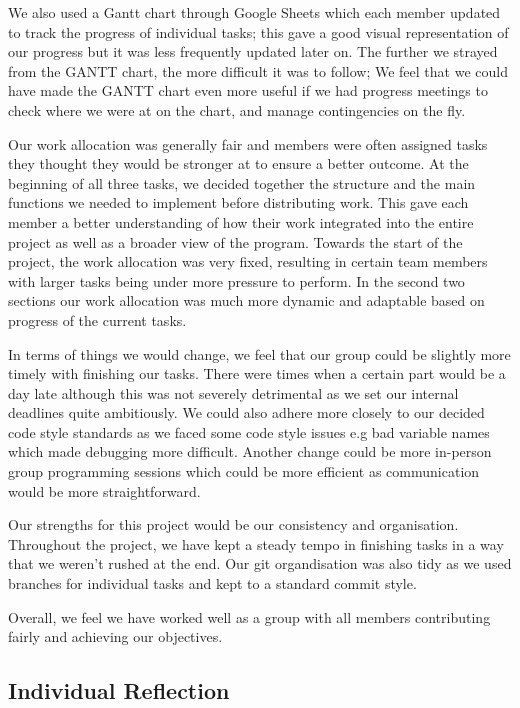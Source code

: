 \documentclass[11pt]{article}
\begin{document}
We also used a Gantt chart through Google Sheets which each member updated to track the progress of individual tasks; this gave a good visual representation of our progress but it was less frequently updated later on. The further we strayed from the GANTT chart, the more difficult it was to follow; We feel that we could have made the GANTT chart even more useful if we had progress meetings to check where we were at on the chart, and manage contingencies on the fly. 

Our work allocation was generally fair and members were often assigned tasks they thought they would be stronger at to ensure a better outcome. At the beginning of all three tasks, we decided together the structure and the main functions we needed to implement before distributing work. This gave each member a better understanding of how their work integrated into the entire project as well as a broader view of the program. Towards the start of the project, the work allocation was very fixed, resulting in certain team members with larger tasks being under more pressure to perform. In the second two sections our work allocation was much more dynamic and adaptable based on progress of the current tasks.

In terms of things we would change, we feel that our group could be slightly more timely with finishing our tasks. There were times when a certain part would be a day late although this was not severely detrimental as we set our internal deadlines quite ambitiously. We could also adhere more closely to our decided code style standards as we faced some code style issues e.g bad variable names which made debugging more difficult. Another change could be more in-person group programming sessions which could be more efficient as communication would be more straightforward.

Our strengths for this project would be our consistency and organisation. Throughout the project, we have kept a steady tempo in finishing tasks in a way that we weren't rushed at the end. Our git organdisation was also tidy as we used branches for individual tasks and kept to a standard commit style.

Overall, we feel we have worked well as a group with all members contributing fairly and achieving our objectives.
  \subsection*{Individual Reflection}
\end{document}
